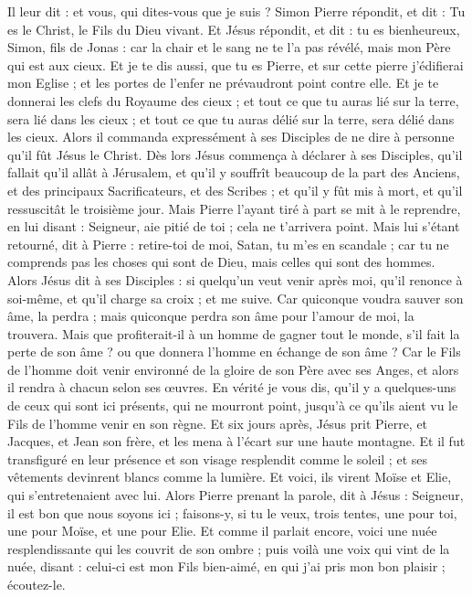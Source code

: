 \begin{multicols}{2}
Il leur dit : et vous, qui dites-vous que je suis ?
Simon Pierre répondit, et dit : Tu es le Christ, le Fils du Dieu vivant.
Et Jésus répondit, et dit : tu es bienheureux, Simon, fils de Jonas : car la chair et le sang ne te l'a pas révélé, mais mon Père qui est aux cieux.
Et je te dis aussi, que tu es Pierre, et sur cette pierre j'édifierai mon Eglise ; et les portes de l'enfer ne prévaudront point contre elle.
Et je te donnerai les clefs du Royaume des cieux ; et tout ce que tu auras lié sur la terre, sera lié dans les cieux ; et tout ce que tu auras délié sur la terre, sera délié dans les cieux.
Alors il commanda expressément à ses Disciples de ne dire à personne qu'il fût Jésus le Christ.
Dès lors Jésus commença à déclarer à ses Disciples, qu'il fallait qu'il allât à Jérusalem, et qu'il y souffrît beaucoup de la part des Anciens, et des principaux Sacrificateurs, et des Scribes ; et qu'il y fût mis à mort, et qu'il ressuscitât le troisième jour.
Mais Pierre l'ayant tiré à part se mit à le reprendre, en lui disant : Seigneur, aie pitié de toi ; cela ne t'arrivera point.
Mais lui s'étant retourné, dit à Pierre : retire-toi de moi, Satan, tu m'es en scandale ; car tu ne comprends pas les choses qui sont de Dieu, mais celles qui sont des hommes.
Alors Jésus dit à ses Disciples : si quelqu'un veut venir après moi, qu'il renonce à soi-même, et qu'il charge sa croix ; et me suive.
Car quiconque voudra sauver son âme, la perdra ; mais quiconque perdra son âme pour l'amour de moi, la trouvera.
Mais que profiterait-il à un homme de gagner tout le monde, s'il fait la perte de son âme ? ou que donnera l'homme en échange de son âme ?
Car le Fils de l'homme doit venir environné de la gloire de son Père avec ses Anges, et alors il rendra à chacun selon ses œuvres.
En vérité je vous dis, qu'il y a quelques-uns de ceux qui sont ici présents, qui ne mourront point, jusqu'à ce qu'ils aient vu le Fils de l'homme venir en son règne.
\VerseOne{}Et six jours après, Jésus prit Pierre, et Jacques, et Jean son frère, et les mena à l'écart sur une haute montagne.
Et il fut transfiguré en leur présence et son visage resplendit comme le soleil ; et ses vêtements devinrent blancs comme la lumière.
Et voici, ils virent Moïse et Elie, qui s'entretenaient avec lui.
Alors Pierre prenant la parole, dit à Jésus : Seigneur, il est bon que nous soyons ici ; faisons-y, si tu le veux, trois tentes, une pour toi, une pour Moïse, et une pour Elie.
Et comme il parlait encore, voici une nuée resplendissante qui les couvrit de son ombre ; puis voilà une voix qui vint de la nuée, disant : celui-ci est mon Fils bien-aimé, en qui j'ai pris mon bon plaisir ; écoutez-le.

\end{multicols}
